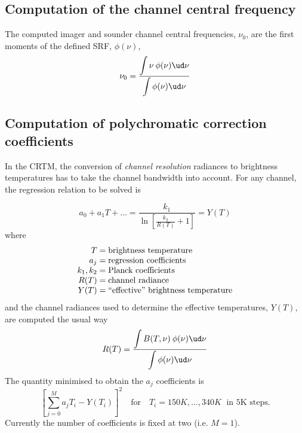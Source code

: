 \subsection{Computation of the channel central frequency}
The computed imager and sounder channel central frequencies, $\nu_0$, are the first moments of the defined SRF, $\phi(\nu)$,
\begin{equation}
  \nu_0 = \frac{\displaystyle\int{\nu\:\phi(\nu)\ud \nu}}{\displaystyle\int{\phi(\nu)\ud \nu}}
\end{equation}


\subsection{Computation of polychromatic correction coefficients}
In the CRTM, the conversion of \emph{channel resolution} radiances to brightness temperatures has to take the channel bandwidth into account. For any channel, the regression relation to be solved is

\begin{equation}
  a_0 + a_1T + \ldots = \frac{\displaystyle k_1}{\displaystyle \ln\left[\frac{k_2}{R(T)}+1\right]} = Y(T)
\end{equation}
where
\begin{equation}
  \begin{array}{r@{\;=\;}l}
         T &\mbox{brightness temperature} \\
        a_j&\mbox{regression coefficients} \\
    k_1,k_2&\mbox{Planck coefficients} \\
       R(T)&\mbox{channel radiance} \\
       Y(T)&\mbox{``effective'' brightness temperature}
  \end{array}
\end{equation}
and the channel radiances used to determine the effective temperatures, $Y(T)$, are computed the usual way
\begin{equation}
  R(T) = \frac{\displaystyle\int{B(T,\nu)\:\phi(\nu)\ud \nu}}{\displaystyle\int{\phi(\nu)\ud \nu}}
\end{equation}
The quantity minimised to obtain the $a_j$ coefficients is
\begin{equation}
  \left[ \sum_{j=0}^{M}a_j T_{i} - Y(T_{i}) \right]^2 \quad\mbox{for}\quad T_i = 150K, \ldots, 340K \;\mbox{ in 5K steps.}
\end{equation}
Currently the number of coefficients is fixed at two (i.e. $M=1$).



